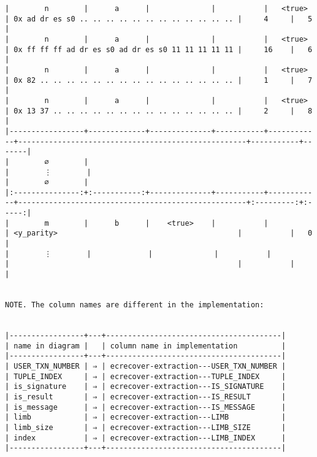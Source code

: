 \documentclass[varwidth=\maxdimen,margin=0.5cm,multi={verbatim}]{standalone}
\begin{document}
\begin{verbatim}
|        n        |      a      |              |           |   <true>   | 0x ad dr es s0 .. .. .. .. .. .. .. .. .. .. .. .. |     4     |   5   |
|        n        |      a      |              |           |   <true>   | 0x ff ff ff ad dr es s0 ad dr es s0 11 11 11 11 11 |     16    |   6   |
|        n        |      a      |              |           |   <true>   | 0x 82 .. .. .. .. .. .. .. .. .. .. .. .. .. .. .. |     1     |   7   |
|        n        |      a      |              |           |   <true>   | 0x 13 37 .. .. .. .. .. .. .. .. .. .. .. .. .. .. |     2     |   8   |
|-----------------+-------------+--------------+-----------+------------+----------------------------------------------------+-----------+-------|
|        ∅        |
|        ⋮        |
|        ∅        |
|:---------------:+:-----------:+--------------+-----------+------------+----------------------------------------------------+:---------:+:-----:|
|        m        |      b      |    <true>    |           |            | <y_parity>                                         |           |   0   |
|        ⋮        |             |              |           |            |                                                    |           |       |


NOTE. The column names are different in the implementation:


|-----------------+---+----------------------------------------|
| name in diagram |   | column name in implementation          |
|-----------------+---+----------------------------------------|
| USER_TXN_NUMBER | ⇒ | ecrecover-extraction---USER_TXN_NUMBER |
| TUPLE_INDEX     | ⇒ | ecrecover-extraction---TUPLE_INDEX     |
| is_signature    | ⇒ | ecrecover-extraction---IS_SIGNATURE    |
| is_result       | ⇒ | ecrecover-extraction---IS_RESULT       |
| is_message      | ⇒ | ecrecover-extraction---IS_MESSAGE      |
| limb            | ⇒ | ecrecover-extraction---LIMB            |
| limb_size       | ⇒ | ecrecover-extraction---LIMB_SIZE       |
| index           | ⇒ | ecrecover-extraction---LIMB_INDEX      |
|-----------------+---+----------------------------------------|


\end{verbatim}
\end{document}
